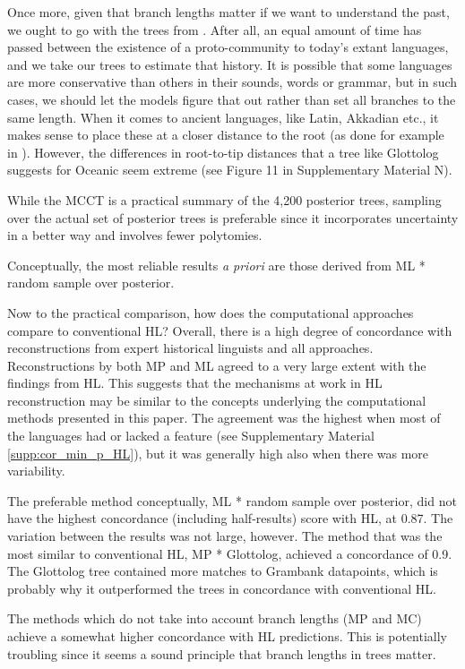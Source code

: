 \documentclass[12pt,letterpaper]{article}
\begin{document}
Once more, given that branch lengths matter if we want to understand the past, we ought to go with the trees from \cite{grayetal_2009}. After all, an equal amount of time has passed between the existence of a proto-community to today's extant languages, and we take our trees to estimate that history. It is possible that some languages are more conservative than others in their sounds, words or grammar, but in such cases, we should let the models figure that out rather than set all branches to the same length. When it comes to ancient languages, like Latin, Akkadian etc., it makes sense to place these at a closer distance to the root (as done for example in \citealt{carling2021reconstructing}). However, the differences in root-to-tip distances that a tree like Glottolog suggests for Oceanic seem extreme (see Figure 11 in Supplementary Material N). 

While the MCCT is a practical summary of the 4,200 posterior trees, sampling over the actual set of posterior trees is preferable since it incorporates uncertainty in a better way and involves fewer polytomies.

Conceptually, the most reliable results \textit{a priori} are those derived from ML * random sample over posterior.

Now to the practical comparison, how does the computational approaches compare to conventional HL? Overall, there is a high degree of concordance with reconstructions from expert historical linguists and all approaches. Reconstructions by both MP and ML agreed to a very large extent with the findings from HL. This suggests that the mechanisms at work in HL reconstruction may be similar to the concepts underlying the computational methods presented in this paper. The agreement was the highest when most of the languages had or lacked a feature (see Supplementary Material \ref{supp:cor_min_p_HL}), but it was generally high also when there was more variability.

The preferable method conceptually, ML * random sample over \citet{grayetal_2009} posterior, did not have the highest concordance (including half-results) score with HL, at 0.87. The variation between the results was not large, however. The method that was the most similar to conventional HL, MP * Glottolog, achieved a concordance of 0.9. The Glottolog tree contained more matches to Grambank datapoints, which is probably why it outperformed the \cite{grayetal_2009} trees in concordance with conventional HL.

The methods which do not take into account branch lengths (MP and MC) achieve a somewhat higher concordance with HL predictions. This is potentially troubling since it seems a sound principle that branch lengths in trees matter.
\end{document}
